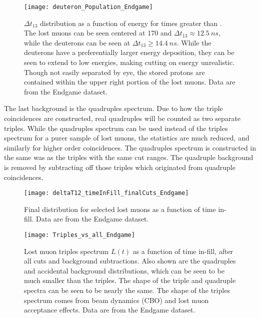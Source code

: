 \begin{figure}[h]
    \centering
    \texttt{[image: deuteron\_Population\_Endgame]}
    \caption[Deuteron population at late times]{$\Delta t_{13}$ distribution as a function of energy for times greater than . The lost muons can be seen centered at 170 \MeV and $\Delta t_{13} \approx \SI{12.5}{ns}$, while the deuterons can be seen at $\Delta t_{13} \geq \SI{14.4}{ns}$. While the deuterons have a preferentially larger energy deposition, they can be seen to extend to low energies, making cutting on energy unrealistic. Though not easily separated by eye, the stored protons are contained within the upper right portion of the lost muons. Data are from the Endgame dataset.}
    \label{fig:deuteronPop}
\end{figure}


The last background is the quadruples spectrum. Due to how the triple coincidences are constructed, real quadruples will be counted as two separate triples. While the quadruples spectrum can be used instead of the triples spectrum for a purer sample of lost muons, the statistics are much reduced, and similarly for higher order coincidences. The quadruples spectrum is constructed in the same was as the triples with the same cut ranges. The quadruple background is removed by subtracting off those triples which originated from quadruple coincidences.


\begin{figure}
    \centering
    \texttt{[image: deltaT12\_timeInFill\_finalCuts\_Endgame]}
    \caption[Final \DT distribution for selected lost muons]{Final \DT distribution for selected lost muons as a function of time in-fill. Data are from the Endgame dataset.}
    \label{fig:finalDT12Dist}
\end{figure}

\begin{figure}
    \centering
    \texttt{[image: Triples\_vs\_all\_Endgame]}
    \caption[Lost muon triples spectrum compared to quadruples and accidental background]{Lost muon triples spectrum $L(t)$ as a function of time in-fill, after all cuts and background subtractions. Also shown are the quadruples and accidental background distributions, which can be seen to be much smaller than the triples. The shape of the triple and quadruple spectra can be seen to be nearly the same. The shape of the triples spectrum comes from beam dynamics (CBO) and lost muon acceptance effects. Data are from the Endgame dataset.}
    \label{fig:triples}
\end{figure}


